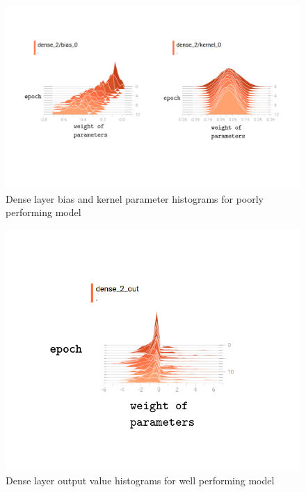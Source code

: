 \documentclass{article}
\begin{document}
\begin{figure}[h]
  \includegraphics[width=\linewidth]{baddense.pdf}
  \caption{Dense layer bias and kernel parameter histograms for poorly performing model}
  \label{fig:baddenseweights}
\end{figure}

\begin{figure}[h]
  \includegraphics[scale=0.8]{gooddenseout.pdf}
  \caption{Dense layer output value histograms for well performing model}
  \label{fig:gooddenseout}
\end{figure}
\end{document}
